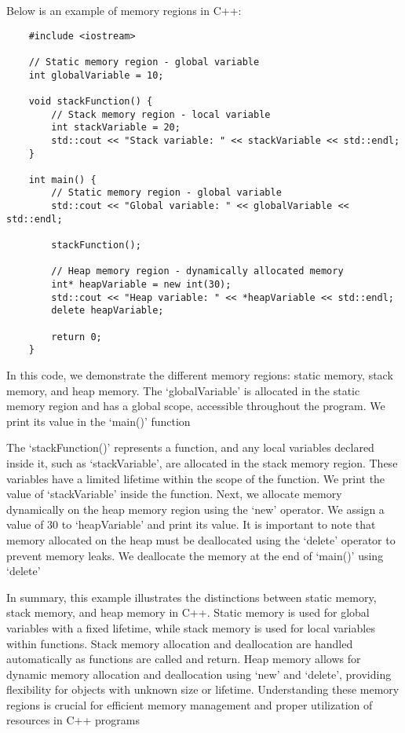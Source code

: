 \begin{solution}
    Below is an example of memory regions in C++:
    
    \horizontalline
    
    \begin{verbatim}   
    #include <iostream>

    // Static memory region - global variable
    int globalVariable = 10;
    
    void stackFunction() {
        // Stack memory region - local variable
        int stackVariable = 20;
        std::cout << "Stack variable: " << stackVariable << std::endl;
    }
    
    int main() {
        // Static memory region - global variable
        std::cout << "Global variable: " << globalVariable << std::endl;
    
        stackFunction();
    
        // Heap memory region - dynamically allocated memory
        int* heapVariable = new int(30);
        std::cout << "Heap variable: " << *heapVariable << std::endl;
        delete heapVariable;
    
        return 0;
    }
        \end{verbatim}
    
    \horizontalline
    
    In this code, we demonstrate the different memory regions: static memory, stack memory, and heap memory. The `globalVariable' is allocated in the static memory region and has a global scope, accessible throughout the program. We print its value in 
    the `main()' function
    
    The `stackFunction()' represents a function, and any local variables declared inside it, such as `stackVariable', are allocated in the stack memory region. These variables have a limited lifetime within the scope of the function. We print the value 
    of `stackVariable' inside the function. Next, we allocate memory dynamically on the heap memory region using the `new' operator. We assign a value of 30 to `heapVariable' and print its value. It is important to note that memory allocated on the heap 
    must be deallocated using the `delete' operator to prevent memory leaks. We deallocate the memory at the end of `main()' using `delete'
    
    In summary, this example illustrates the distinctions between static memory, stack memory, and heap memory in C++. Static memory is used for global variables with a fixed lifetime, while stack memory is used for local variables within functions. Stack 
    memory allocation and deallocation are handled automatically as functions are called and return. Heap memory allows for dynamic memory allocation and deallocation using `new' and `delete', providing flexibility for objects with unknown size or lifetime. 
    Understanding these memory regions is crucial for efficient memory management and proper utilization of resources in C++ programs
\end{solution}

